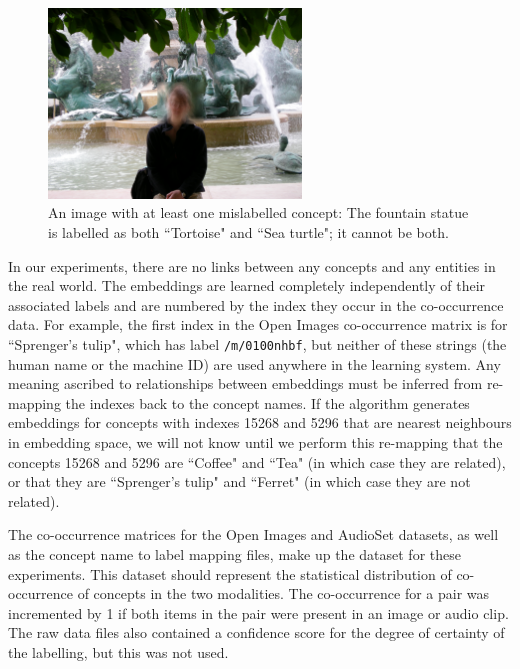 \begin{figure}[H]
\label{fig:tortoiseseaturtle}
    \centering
    \includegraphics[width=0.6\textwidth]{images/method/tortoise_seaturtle.jpg}
    \caption{
        An image with at least one mislabelled concept: The fountain statue is labelled as both ``Tortoise" and ``Sea turtle"; it cannot be both. 
    }
\end{figure}

In our experiments, there are no links between any concepts and any entities in the real world. The embeddings are learned completely independently of their associated labels and are numbered by the index they occur in the co-occurrence data. For example, the first index in the Open Images co-occurrence matrix is for ``Sprenger's tulip", which has label \texttt{/m/0100nhbf}, but neither of these strings (the human name or the machine ID) are used anywhere in the learning system. Any meaning ascribed to relationships between embeddings must be inferred from re-mapping the indexes back to the concept names. If the algorithm generates embeddings for concepts with indexes 15268 and 5296 that are nearest neighbours in embedding space, we will not know until we perform this re-mapping that the concepts 15268 and 5296 are ``Coffee" and ``Tea" (in which case they are related), or that they are ``Sprenger's tulip" and ``Ferret" (in which case they are not related). 

The co-occurrence matrices for the Open Images and AudioSet datasets, as well as the concept name to label mapping files, make up the dataset for these experiments. This dataset should represent the statistical distribution of co-occurrence of concepts in the two modalities. The co-occurrence for a pair was incremented by 1 if both items in the pair were present in an image or audio clip. The raw data files also contained a confidence score for the degree of certainty of the labelling, but this was not used. 

